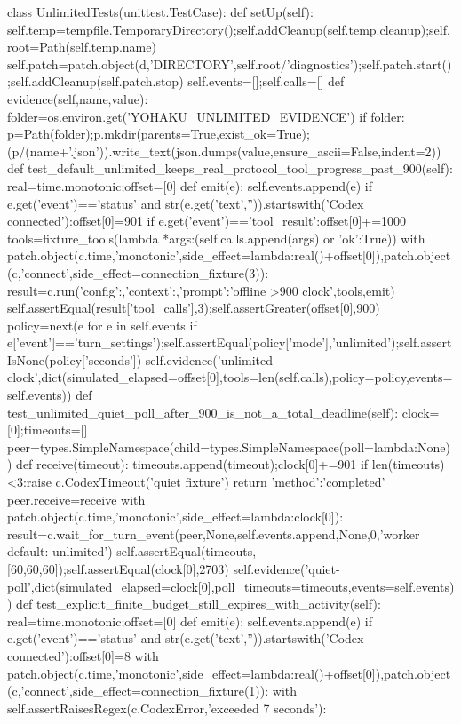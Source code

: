 class UnlimitedTests(unittest.TestCase):
 def setUp(self):
  self.temp=tempfile.TemporaryDirectory();self.addCleanup(self.temp.cleanup);self.root=Path(self.temp.name)
  self.patch=patch.object(d,'DIRECTORY',self.root/'diagnostics');self.patch.start();self.addCleanup(self.patch.stop)
  self.events=[];self.calls=[]
 def evidence(self,name,value):
  folder=os.environ.get('YOHAKU_UNLIMITED_EVIDENCE')
  if folder:
   p=Path(folder);p.mkdir(parents=True,exist_ok=True);(p/(name+'.json')).write_text(json.dumps(value,ensure_ascii=False,indent=2))
 def test_default_unlimited_keeps_real_protocol_tool_progress_past_900(self):
  real=time.monotonic;offset=[0]
  def emit(e):
   self.events.append(e)
   if e.get('event')=='status' and str(e.get('text','')).startswith('Codex connected'):offset[0]=901
   if e.get('event')=='tool_result':offset[0]+=1000
  tools=fixture_tools(lambda *args:(self.calls.append(args) or {'ok':True}))
  with patch.object(c.time,'monotonic',side_effect=lambda:real()+offset[0]),patch.object(c,'connect',side_effect=connection_fixture(3)):
   result=c.run({'config':{},'context':{},'prompt':'offline >900 clock'},tools,emit)
  self.assertEqual(result['tool_calls'],3);self.assertGreater(offset[0],900)
  policy=next(e for e in self.events if e['event']=='turn_settings');self.assertEqual(policy['mode'],'unlimited');self.assertIsNone(policy['seconds'])
  self.evidence('unlimited-clock',dict(simulated_elapsed=offset[0],tools=len(self.calls),policy=policy,events=self.events))
 def test_unlimited_quiet_poll_after_900_is_not_a_total_deadline(self):
  clock=[0];timeouts=[]
  peer=types.SimpleNamespace(child=types.SimpleNamespace(poll=lambda:None))
  def receive(timeout):
   timeouts.append(timeout);clock[0]+=901
   if len(timeouts)<3:raise c.CodexTimeout('quiet fixture')
   return {'method':'completed'}
  peer.receive=receive
  with patch.object(c.time,'monotonic',side_effect=lambda:clock[0]):
   result=c.wait_for_turn_event(peer,None,self.events.append,None,0,'worker default: unlimited')
  self.assertEqual(timeouts,[60,60,60]);self.assertEqual(clock[0],2703)
  self.evidence('quiet-poll',dict(simulated_elapsed=clock[0],poll_timeouts=timeouts,events=self.events))
 def test_explicit_finite_budget_still_expires_with_activity(self):
  real=time.monotonic;offset=[0]
  def emit(e):
   self.events.append(e)
   if e.get('event')=='status' and str(e.get('text','')).startswith('Codex connected'):offset[0]=8
  with patch.object(c.time,'monotonic',side_effect=lambda:real()+offset[0]),patch.object(c,'connect',side_effect=connection_fixture(1)):
   with self.assertRaisesRegex(c.CodexError,'exceeded 7 seconds'):

